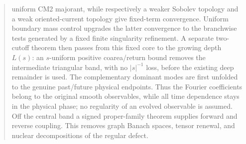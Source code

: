 \documentclass[11pt]{article}
\begin{document}
\begin{abstract}
uniform CM2 majorant, while respectively a weaker Sobolev topology and a
weak oriented-current topology give fixed-term convergence.  Uniform boundary
mass control upgrades the latter convergence to the branchwise tests generated
by a fixed finite singularity refinement.  A separate two-cutoff theorem then
passes from this fixed core to the growing depth $L(s)$: an $s$-uniform
positive coarea/return bound removes the intermediate triangular band, with no
$|s|^{-1}$ loss, before the existing deep remainder is used.
The complementary dominant
modes are first unfolded to the genuine past/future physical endpoints.  Thus
the Fourier coefficients belong to the original smooth observables, while all
time dependence stays in the physical phase; no regularity of an evolved
observable is assumed.  Off the
central band a signed proper-family theorem supplies forward and reverse
coupling.  This removes graph Banach spaces, tensor renewal, and nuclear
decompositions of the regular defect.


\end{abstract}
\end{document}
